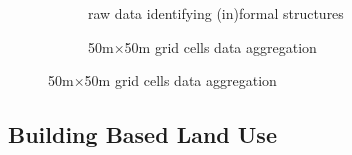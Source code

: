 \documentclass[12pt]{article}
\begin{document}
\begin{figure}[t!]
        \centering
        \caption[ Building-Based Land Use Data ]
        {\small Building-Based Land Use Data } 
        \vspace{2mm}
        \begin{subfigure}[b]{0.48\textwidth}
            \centering
            \caption[Network2]%
            {{\small raw data identifying (in)formal structures}}    
            \label{fig:prefor}
        \end{subfigure}
        \hfill\quad
        \begin{subfigure}[b]{0.48\textwidth}  
            \centering 
            \caption[]%
            {{\small 50m$\times$50m grid cells data aggregation}}    
            \label{fig:preinf}
        \end{subfigure}
        \label{fig:bblumaps}
    \end{figure} 

\subsection{Building Based Land Use}
\label{section:data:bblu}
\end{document}
